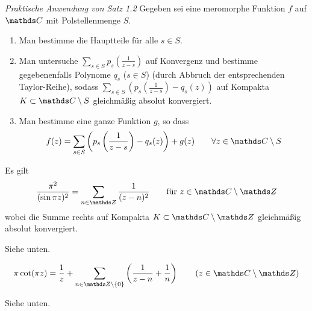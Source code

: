 \emph{Praktische Anwendung von Satz 1.2} Gegeben sei eine meromorphe Funktion $f$ auf $\CC$ mit Polstellenmenge $S$.
\begin{enumerate}
\item Man bestimme die Hauptteile für alle $s\in S$.
\item Man untersuche $\sum _{s\in S} p_s(\frac{1}{z-s})$ auf Konvergenz und bestimme gegebenenfalls Polynome $q_s$ ($s\in S$) (durch Abbruch der entsprechenden Taylor-Reihe), sodass $\sum _{s\in S} (p_s(\frac{1}{z-s})-q_s(z))$ auf Kompakta $K \subset \CC\setminus S$ gleichmäßig absolut konvergiert.
\item Man bestimme eine ganze Funktion $g$, so dass
\[
	f(z) = \sum_{s\in S} \left(p_s\left(\frac{1}{z-s}\right)-q_s(z)\right) + g(z) \qquad \forall z\in \CC\setminus S
\]
\end{enumerate}

\begin{bsp-list}\label{bsp:partialbruch_cot}
\item Es gilt
\begin{equation}\label{eqn:bsp1.3.i}
	\frac{\pi^2}{(\sin \pi z)^2} = \sum _ {n \in \ZZ} \frac{1}{(z-n)^2} \qquad \text{für } z\in \CC\setminus\ZZ
\end{equation}
wobei die Summe rechts auf Kompakta $K \subset \CC\setminus\ZZ$ gleichmäßig absolut konvergiert.
\begin{bewe}
Siehe unten.
\end{bewe}

\item {}
\begin{equation}\label{eqn:bsp1.3.ii}
	\pi\cot(\pi z)
	= \frac{1}{z} + \sum _{n \in \ZZ\setminus\{0\}} \left( \frac{1}{z-n} + \frac{1}{n}\right)
	\qquad (z \in \CC\setminus\ZZ)
\end{equation}

\begin{bewe}
Siehe unten.
\end{bewe}
\end{bsp-list}

